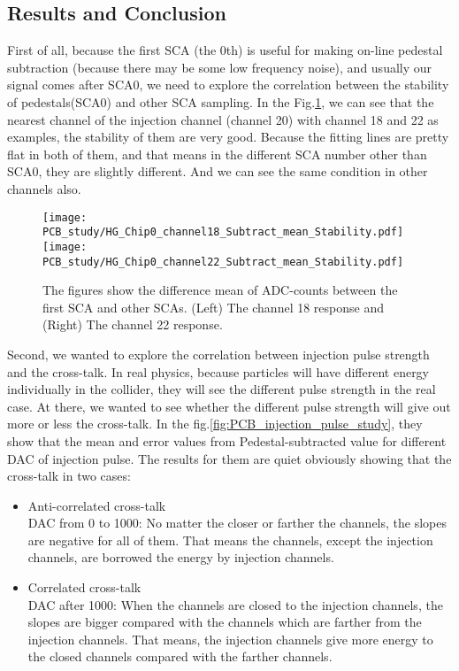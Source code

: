 \documentclass[12pt,twoside,a4paper,an,final]{cms-tdr}
\begin{document}
\subsection{Results and Conclusion}
First of all, because the first SCA (the 0th) is useful for making on-line pedestal subtraction (because there may be some low frequency noise), and usually our signal comes after SCA0, we need to explore the correlation between the stability of pedestals(SCA0) and other SCA sampling.  In the Fig.\ref{fig:PCB_Stability}, we can see that the nearest channel of the injection channel (channel 20) with channel 18 and 22 as examples, the stability of them are very good. Because the fitting lines are pretty flat in both of them, and that means in the different SCA number other than SCA0, they are slightly different. And we can see the same condition in other channels also.

\begin{figure}[!htb]
\centering
     \texttt{[image: PCB\_study/HG\_Chip0\_channel18\_Subtract\_mean\_Stability.pdf]}
     \texttt{[image: PCB\_study/HG\_Chip0\_channel22\_Subtract\_mean\_Stability.pdf]}\\
\caption{The figures show the difference mean of ADC-counts between the first SCA and other SCAs. (Left) The channel 18 response and (Right) The channel 22 response.
}
\label{fig:PCB_Stability}
\end{figure}

Second, we wanted to explore the correlation between injection pulse strength and the cross-talk. In real physics, because particles will have different energy individually in the collider, they will see the different pulse strength in the real case. At there, we wanted to see whether the different pulse strength will give out more or less the cross-talk. In the fig.\ref{fig:PCB_injection_pulse_study}, they show that the mean and error values from Pedestal-subtracted value for different DAC of injection pulse. The results for them are quiet obviously showing that the cross-talk in two cases: 
\begin{itemize}
\item Anti-correlated cross-talk\\
DAC from 0 to 1000: No matter the closer or farther the channels, the slopes are negative for all of them. That means the channels, except the injection channels, are borrowed the energy by injection channels. 
\item Correlated cross-talk\\
DAC after 1000: When the channels are closed to the injection channels, the slopes are bigger compared with the channels which are farther from the injection channels. That means, the injection channels give more energy to the closed channels compared with the farther channels. 
\end{itemize}
\end{document}
